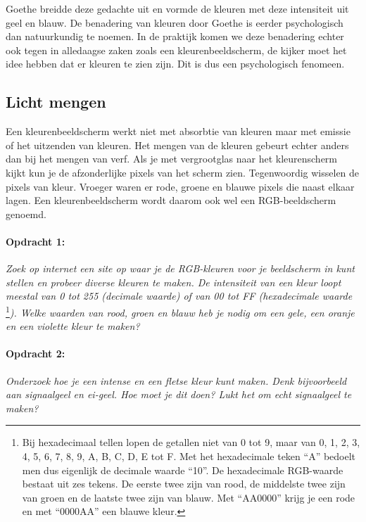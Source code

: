 Goethe breidde deze gedachte uit en vormde de kleuren met deze intensiteit
uit geel en blauw. De benadering van kleuren door Goethe is eerder
psychologisch dan natuurkundig te noemen. In de praktijk komen we
deze benadering echter ook tegen in alledaagse zaken zoals een kleurenbeeldscherm,
de kijker moet het idee hebben dat er kleuren te zien zijn. Dit is
dus een psychologisch fenomeen. 


\subsection{Licht mengen}

Een kleurenbeeldscherm werkt niet met absorbtie van kleuren maar met
emissie of het uitzenden van kleuren. Het mengen van de kleuren gebeurt
echter anders dan bij het mengen van verf. Als je met vergrootglas
naar het kleurenscherm kijkt kun je de afzonderlijke pixels van het
scherm zien. Tegenwoordig wisselen de pixels van kleur. Vroeger waren
er rode, groene en blauwe pixels die naast elkaar lagen. Een kleurenbeeldscherm
wordt daarom ook wel een RGB-beeldscherm genoemd.


\paragraph*{Opdracht 1:}

\emph{Zoek op internet een site op waar je de RGB-kleuren voor je
beeldscherm in kunt stellen en probeer diverse kleuren te maken. De
intensiteit van een kleur loopt meestal van 0 tot 255 (decimale waarde)
of van 00 tot FF (hexadecimale waarde} \footnote{Bij hexadecimaal tellen
lopen de getallen niet van 0 tot 9, maar van 0, 1, 2, 3, 4, 5, 6, 7, 8,
9, A, B, C, D, E tot F. Met het hexadecimale teken ``A'' bedoelt men dus
eigenlijk de decimale waarde ``10''. De hexadecimale RGB-waarde bestaat
uit zes tekens. De eerste twee zijn van rood, de middelste twee zijn van
groen en de laatste twee zijn van blauw. Met ``AA0000'' krijg je een
rode en met ``0000AA'' een blauwe kleur.}\emph{). Welke waarden van
rood, groen en blauw heb je nodig om een gele, een oranje en een
violette kleur te maken?}


\paragraph*{Opdracht 2:}

\emph{Onderzoek hoe je een intense en een fletse kleur kunt maken.
Denk bijvoorbeeld aan signaalgeel en ei-geel. Hoe moet je dit doen?
Lukt het om echt signaalgeel te maken?}

